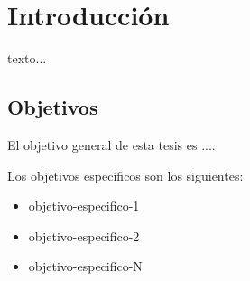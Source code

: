 
\chapter[Introducción]{\label{ch:intro}Introducción}

texto...


\section{Objetivos}

El objetivo general de esta tesis es ....


Los objetivos específicos son los siguientes:

\begin{itemize}
\item objetivo-especifico-1
\item objetivo-especifico-2
\item objetivo-especifico-N
\end{itemize}



